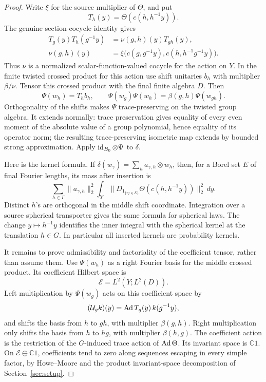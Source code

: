 \begin{proof}
Write \(\xi\) for the source multiplier of \(\Theta\), and put
\[
 T_h(y)=\Theta(c(h,h^{-1}y)).
\]
The genuine section-cocycle identity gives
\begin{align*}
 T_g(y)T_h(g^{-1}y)
 &=\nu(g,h)(y)T_{gh}(y),\\
 \nu(g,h)(y)
 &=\xi\bigl(c(g,g^{-1}y),
           c(h,h^{-1}g^{-1}y)\bigr).
\end{align*}
Thus \(\nu\) is a normalized scalar-function-valued cocycle
for the action on \(Y\).  In the finite twisted crossed
product for this action use shift unitaries \(b_h\) with
multiplier \(\beta/\nu\).  Tensor this crossed product with
the final finite algebra \(D\).  Then
\begin{equation}\label{eq:scale-insertion}
 \Psi(w_h)=T_hb_h,\qquad
 \Psi(w_g)\Psi(w_h)=\beta(g,h)\Psi(w_{gh}).
\end{equation}
Orthogonality of the shifts makes \(\Psi\) trace-preserving
on the twisted group algebra.  It extends normally:
trace preservation gives equality of every even moment
of the absolute value of a group polynomial, hence equality
of its operator norm; the resulting trace-preserving
isometric map extends by bounded strong approximation.
Apply \(\operatorname{id}_{B_0}\otimes\Psi\) to \(\delta\).

Here is the kernel formula.  If
\(\delta(w_\gamma)=\sum_h a_{\gamma,h}\otimes w_h\), then,
for a Borel set \(E\) of final Fourier lengths, its mass
after insertion is
\begin{equation}\label{eq:scale-kernel-composition}
 \sum_{h\in\Gamma}\|a_{\gamma,h}\|_2^2
       \int_Y\bigl\|D_{1_{\{r_T\in E\}}}
                    \Theta(c(h,h^{-1}y))\bigr\|_2^2\,dy .
\end{equation}
Distinct \(h\)'s are orthogonal in the middle shift
coordinate.  Integration over a source spherical
transporter gives the same formula for spherical laws.
The change \(y\mapsto h^{-1}y\) identifies the inner
integral with the spherical kernel at the translation
\(h\in G\).  In particular all inserted kernels are
probability kernels.

It remains to prove admissibility and factoriality of
the coefficient tensor, rather than assume them.
Use \(\Psi(w_h)\) as a right Fourier basis for the middle
crossed product.  Its coefficient Hilbert space is
\[
 \mathcal E=L^2(Y;L^2(D)).
\]
Left multiplication by \(\Psi(w_g)\) acts on this coefficient
space by
\begin{equation}
 (\mathcal U_gk)(y)=\operatorname{Ad} T_g(y)\,k(g^{-1}y),
 \label{eq:scale-induced-coefficients}
\end{equation}
and shifts the basis from \(h\) to \(gh\), with multiplier
\(\beta(g,h)\).  Right multiplication only shifts the
basis from \(h\) to \(hg\), with multiplier
\(\beta(h,g)\).  The coefficient action is the restriction
of the \(G\)-induced trace action of \(\operatorname{Ad}\Theta\).
Its invariant space is \(\mathbb C1\).  On
\(\mathcal E\ominus\mathbb C1\), coefficients tend to zero
along sequences escaping in every simple factor, by
Howe--Moore and the product invariant-space decomposition
of Section~\ref{sec:setup}.


\end{proof}
